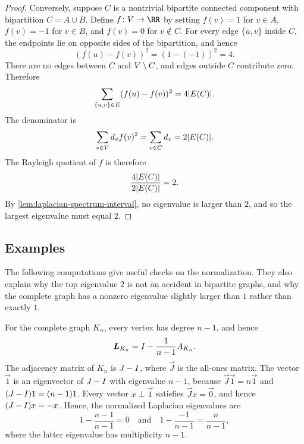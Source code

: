 \begin{proof}
	Conversely, suppose \(C\) is a nontrivial bipartite connected component with bipartition \(C=A\cup B\). Define \(f\colon \Vertices\to\RR\) by setting \(f(v)=1\) for \(v\in A\), \(f(v)=-1\) for \(v\in B\), and \(f(v)=0\) for \(v\notin C\). For every edge \(\{u,v\}\) inside \(C\), the endpoints lie on opposite sides of the bipartition, and hence
	\begin{equation}
		\left(f(u)-f(v)\right)^2=(1-(-1))^2=4.
	\end{equation}
	There are no edges between \(C\) and \(V\setminus C\), and edges outside \(C\) contribute zero. Therefore
	\begin{equation}
		\sum_{\{u,v\}\in E}(f(u)-f(v))^2=4\lvert E(C)\rvert.
	\end{equation}
	The denominator is
	\begin{equation}
		\sum_{v\in V}d_v f(v)^2=\sum_{v\in C}d_v=2\lvert E(C)\rvert.
	\end{equation}
	The Rayleigh quotient of \(f\) is therefore
	\begin{equation}
		\frac{4\lvert E(C)\rvert}{2\lvert E(C)\rvert}=2.
	\end{equation}
	By \cref{lem:laplacian-spectrum-interval}, no eigenvalue is larger than \(2\), and so the largest eigenvalue must equal \(2\).
\end{proof}

\subsection{Examples}
\label{subsec:laplacian-examples}

The following computations give useful checks on the normalization. They also explain why the top eigenvalue \(2\) is not an accident in bipartite graphs, and why the complete graph has a nonzero eigenvalue slightly larger than \(1\) rather than exactly \(1\).

\begin{example}
	\label{ex:laplacian-complete-graph}
	For the complete graph \(K_n\), every vertex has degree \(n-1\), and hence
	\begin{equation}
		\boldsymbol{L}_{K_n}=I-\frac{1}{n-1}A_{K_n}.
	\end{equation}
	The adjacency matrix of \(K_n\) is \(J-I\), where \(\vec{J}\) is the all-ones matrix. The vector \(\vec{1}\) is an eigenvector of \(J-I\) with eigenvalue \(n-1\), because \(\vec{J}\vec{1}=n\vec{1}\) and \((J-I)1=(n-1)1\). Every vector \(x\perp \vec{1}\) satisfies \(\vec{J}x=\vec{0}\), and hence \((J-I)x=-x\). Hence, the normalized Laplacian eigenvalues are
	\begin{equation}
		1-\frac{n-1}{n-1}=0
		\quad\text{and}\quad
		1-\frac{-1}{n-1}=\frac{n}{n-1},
	\end{equation}
	where the latter eigenvalue has multiplicity \(n-1\).
\end{example}

